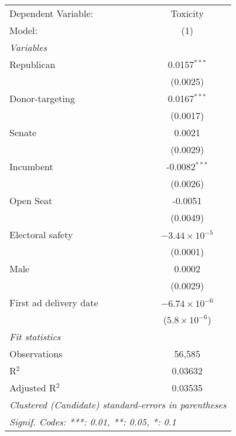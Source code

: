 
\begingroup
\centering
\begin{tabular}{lc}
   \tabularnewline \midrule \midrule
   Dependent Variable:    & Toxicity\\  
   Model:                 & (1)\\  
   \midrule
   \emph{Variables}\\
   Republican             & 0.0157$^{***}$\\   
                          & (0.0025)\\   
   Donor-targeting        & 0.0167$^{***}$\\   
                          & (0.0017)\\   
   Senate                 & 0.0021\\   
                          & (0.0029)\\   
   Incumbent              & -0.0082$^{***}$\\   
                          & (0.0026)\\   
   Open Seat              & -0.0051\\   
                          & (0.0049)\\   
   Electoral safety       & $-3.44\times 10^{-5}$\\    
                          & (0.0001)\\   
   Male                   & 0.0002\\   
                          & (0.0029)\\   
   First ad delivery date & $-6.74\times 10^{-6}$\\    
                          & ($5.8\times 10^{-6}$)\\    
   \midrule
   \emph{Fit statistics}\\
   Observations           & 56,585\\  
   R$^2$                  & 0.03632\\  
   Adjusted R$^2$         & 0.03535\\  
   \midrule \midrule
   \multicolumn{2}{l}{\emph{Clustered (Candidate) standard-errors in parentheses}}\\
   \multicolumn{2}{l}{\emph{Signif. Codes: ***: 0.01, **: 0.05, *: 0.1}}\\
\end{tabular}
\par\endgroup


